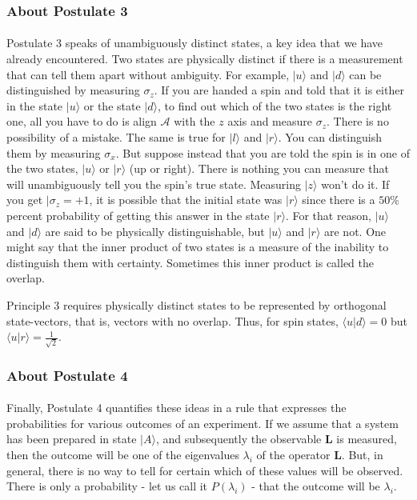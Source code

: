 \documentclass[a4paper,10pt]{article}
\begin{document}
\subsubsection{About Postulate 3}
\paragraph{} Postulate 3 speaks of unambiguously distinct states, a key idea that we have already encountered. Two states are physically distinct if there is a measurement that can tell them apart without ambiguity. For example, $|u\rangle$ and $|d\rangle$ can be distinguished by measuring $\sigma_z$. If you are handed a spin and told that it is either in the state $|u\rangle$ or the state $|d\rangle$, to find out which of the two states is the right one, all you have to do is align $\mathcal{A}$ with the $z$ axis and measure $\sigma_z$. There is no possibility of a mistake. The same is true for $|l\rangle$ and $|r\rangle$. You can distinguish them by measuring $\sigma_x$. But suppose instead that you are told the spin is in one of the two states, $|u\rangle$ or $|r\rangle$ (up or right). There is nothing you can measure that will unambiguously tell you the spin's true state. Measuring $|z\rangle$ won't do it. If you get $|\sigma_z = +1$, it is possible that the initial state was $|r\rangle$ since there is a $50\%$ percent probability of getting this answer in the state $|r\rangle$. For that reason, $|u\rangle$ and $|d\rangle$ are said to be physically distinguishable, but $|u\rangle$ and $|r\rangle$ are not. One might say that the inner product of two states is a measure of the inability to distinguish them with certainty. Sometimes this inner product is called the overlap. 

Principle 3 requires physically distinct states to be represented by orthogonal state-vectors, that is, vectors with no overlap. Thus, for spin states, $\langle u|d\rangle = 0$ but $\langle u|r\rangle = \frac{1}{\sqrt{2}}.$ 

\subsubsection{About Postulate 4}
\paragraph{} Finally, Postulate 4 quantifies these ideas in a rule that expresses the probabilities for various outcomes of an experiment. If we assume that a system has been prepared in state $|A\rangle$, and subsequently the observable $\mathbf{L}$ is measured, then the outcome will be one of the eigenvalues $\lambda_i$ of the operator $\mathbf{L}$. But, in general, there is no way to tell for certain which of these values will be observed. There is only a probability - let us call it $P(\lambda_i)$ - that the outcome will be $\lambda_i$. 
\end{document}
